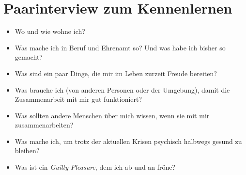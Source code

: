 \section{Paarinterview zum Kennenlernen}
\label{paarinterview}

\begin{itemize}
 \item Wo und wie wohne ich?
 \item Was mache ich in Beruf und Ehrenamt so? Und was habe ich bisher so gemacht?
 \item Was sind ein paar Dinge, die mir im Leben zurzeit Freude bereiten?
 \item Was brauche ich (von anderen Personen oder der Umgebung), damit die Zusammenarbeit mit mir gut funktioniert?
 \item Was sollten andere Menschen über mich wissen, wenn sie mit mir zusammenarbeiten?
 \item Was mache ich, um trotz der aktuellen Krisen psychisch halbwegs gesund zu bleiben?
 \item Was ist ein \emph{Guilty Pleasure}, dem ich ab und an fröne?
\end{itemize}
